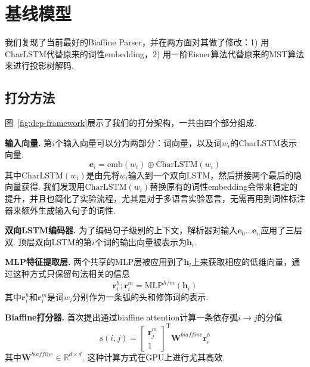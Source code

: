 \section{基线模型}
\label{sec:basic_model}

我们复现了当前最好的Biaffine Parser\cite{Timothy-d17-biaffine}，并在两方面对其做了修改：1) 用CharLSTM代替原来的词性embedding，2) 用一阶Eisner算法\cite{eisner-2000-iwptbook}代替原来的MST算法来进行投影树解码.

\subsection{打分方法}
图~\ref{fig:dep-framework}展示了我们的打分架构，一共由四个部分组成.

\textbf{输入向量.}
第$i$个输入向量可以分为两部分：词向量，以及词$w_i$的CharLSTM表示向量.
\begin{equation}
    \label{eq:input}
    \mathbf{e}_i=\mathrm{emb}({w_i}) \oplus \mathrm{CharLSTM}(w_i)
\end{equation}
其中$\mathrm{CharLSTM}(w_i)$是由先将$w_i$输入到一个双向LSTM，然后拼接两个最后的隐向量获得\cite{lample-etal-2016-neural}.
我们发现用$\mathrm{CharLSTM}(w_i)$替换原有的词性embedding会带来稳定的提升，并且也简化了实验流程，尤其是对于多语言实验恶言，无需再用到词性标注器来额外生成输入句子的词性.

\noindent\textbf{双向LSTM编码器.}
为了编码句子级别的上下文，解析器对输入$\mathbf{e}_0 \dots \mathbf{e}_n$应用了三层双.
顶层双向LSTM的第$i$个词的输出向量被表示为$\mathbf{h}_i$.

\noindent\textbf{MLP特征提取层.}
两个共享的MLP层被应用到了$\mathbf{h}_i$上来获取相应的低维向量，通过这种方式只保留句法相关的信息
\begin{equation}
    \label{mlp-arc}
    \mathbf{r}_i^{h}; \mathbf{r}_i^{m} =\mathrm{MLP}^{h/m} \left( \mathbf{h}_i \right)
\end{equation}
其中$\mathbf{r}_i^{h}$和$\mathbf{r}_i^{m}$是词$w_i$分别作为一条弧的头和修饰词的表示.

\noindent\textbf{Biaffine打分器.}
\cite{Timothy-d17-biaffine}首次提出通过biaffine attention计算一条依存弧$i \rightarrow j$的分值
\begin{equation} \label{eq:biaffine}
    s(i,j) =  \left[
        \begin{array}{c}
            \mathbf{r}_{j}^{m} \\
            1
        \end{array}
        \right]^\mathrm{T}
    \mathbf{W}^\textit{biaffine}  \mathbf{r}_{i}^{h}
\end{equation}
其中$\mathbf{W}^\textit{biaffine} \in \mathbb{R}^{d \times d}$.
这种计算方式在GPU上进行尤其高效.

